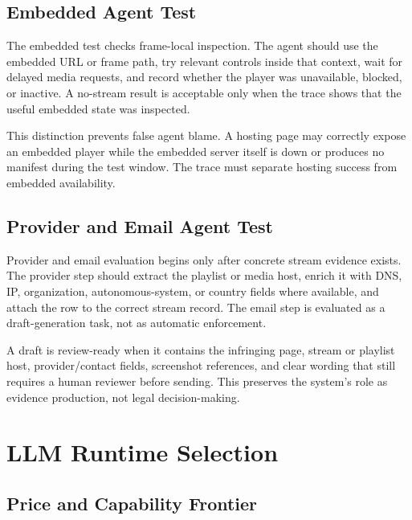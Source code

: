 \subsection{Embedded Agent Test}

The embedded test checks frame-local inspection. The agent should use the embedded URL
or frame path, try relevant controls inside that context, wait for delayed media
requests, and record whether the player was unavailable, blocked, or inactive. A
no-stream result is acceptable only when the trace shows that the useful embedded state
was inspected.



This distinction prevents false agent blame. A hosting page may correctly expose an
embedded player while the embedded server itself is down or produces no manifest during
the test window. The trace must separate hosting success from embedded availability.

\subsection{Provider and Email Agent Test}

Provider and email evaluation begins only after concrete stream evidence exists. The
provider step should extract the playlist or media host, enrich it with DNS, IP,
organization, autonomous-system, or country fields where available, and attach the row
to the correct stream record. The email step is evaluated as a draft-generation task,
not as automatic enforcement.



A draft is review-ready when it contains the infringing page, stream or playlist host,
provider/contact fields, screenshot references, and clear wording that still requires a
human reviewer before sending. This preserves the system's role as evidence production,
not legal decision-making.


\section{LLM Runtime Selection}

\subsection{Price and Capability Frontier}


